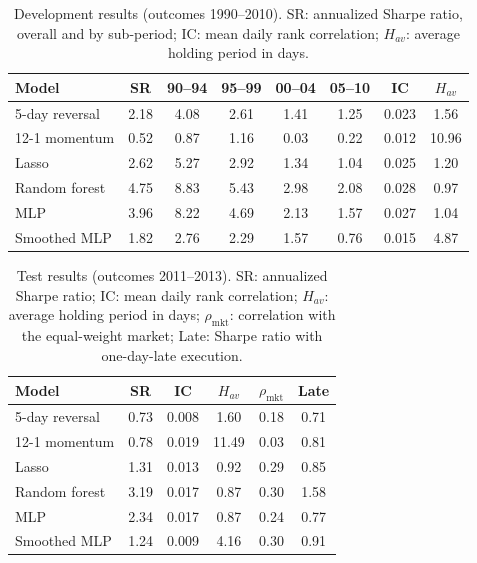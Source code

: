 \documentclass[conference]{IEEEtran}
\begin{document}
\begin{table}[!htb]
\caption{Development results (outcomes 1990--2010). SR: annualized
Sharpe ratio, overall and by sub-period; IC: mean daily rank
correlation; $H_{av}$: average holding period in days.}
\label{tab:t3_dev}
\centering
\footnotesize
\setlength{\tabcolsep}{2.4pt}
\begin{tabular}{lccccccc}
\toprule
Model & SR & 90--94 & 95--99 & 00--04 & 05--10 & IC & $H_{av}$ \\
\midrule
5-day reversal & 2.18 & 4.08 & 2.61 & 1.41 & 1.25 & 0.023 & 1.56 \\
12-1 momentum  & 0.52 & 0.87 & 1.16 & 0.03 & 0.22 & 0.012 & 10.96 \\
Lasso          & 2.62 & 5.27 & 2.92 & 1.34 & 1.04 & 0.025 & 1.20 \\
Random forest  & 4.75 & 8.83 & 5.43 & 2.98 & 2.08 & 0.028 & 0.97 \\
MLP            & 3.96 & 8.22 & 4.69 & 2.13 & 1.57 & 0.027 & 1.04 \\
Smoothed MLP   & 1.82 & 2.76 & 2.29 & 1.57 & 0.76 & 0.015 & 4.87 \\
\bottomrule
\end{tabular}
\end{table}

\begin{table}[!htb]
\caption{Test results (outcomes 2011--2013). SR: annualized Sharpe
ratio; IC: mean daily rank correlation; $H_{av}$: average holding
period in days; $\rho_{\mathrm{mkt}}$: correlation with the
equal-weight market; Late: Sharpe ratio with one-day-late execution.}
\label{tab:t3_test}
\centering
\footnotesize
\setlength{\tabcolsep}{3.5pt}
\begin{tabular}{lccccc}
\toprule
Model & SR & IC & $H_{av}$ & $\rho_{\mathrm{mkt}}$ & Late \\
\midrule
5-day reversal & 0.73 & 0.008 & 1.60  & 0.18 & 0.71 \\
12-1 momentum  & 0.78 & 0.019 & 11.49 & 0.03 & 0.81 \\
Lasso          & 1.31 & 0.013 & 0.92  & 0.29 & 0.85 \\
Random forest  & 3.19 & 0.017 & 0.87  & 0.30 & 1.58 \\
MLP            & 2.34 & 0.017 & 0.87  & 0.24 & 0.77 \\
Smoothed MLP   & 1.24 & 0.009 & 4.16  & 0.30 & 0.91 \\
\bottomrule
\end{tabular}
\end{table}
\end{document}

